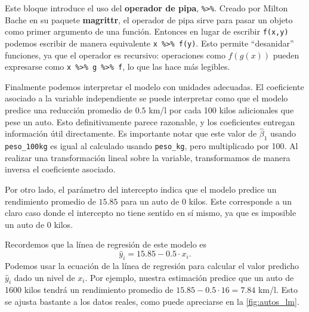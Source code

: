 \documentclass[12pt]{report}\usepackage[]{graphicx}\usepackage[]{color}
\makeatletter
\newcommand*{\paq}[1]{\textbf{#1}\index{#1@\textbf{#1}}}
\newcommand*{\kw}[1]{\textbf{#1}\index{#1}}
\makeatother
\begin{document}
\begin{Rbox}
Este bloque introduce el uso del \kw{operador de pipa}, \verb|%>%|.
Creado por Milton Bache en su paquete \paq{magrittr}, el operador de pipa sirve para pasar un objeto como primer argumento de una función.
Entonces en lugar de escribir \verb|f(x,y)| podemos escribir de manera equivalente \verb|x %>% f(y)|.
Esto permite ``desanidar'' funciones, ya que el operador es recursivo: operaciones como $f(g(x))$ pueden expresarse como \verb|x %>% g %>% f|, lo que las hace más legibles.
\end{Rbox}

Finalmente podemos interpretar el modelo con unidades adecuadas.
El coeficiente asociado a la variable independiente se puede interpretar como que el modelo predice una reducción promedio de $0.5$ km/l por cada 100 kilos adicionales que pese un auto.
Esto definitivamente parece razonable, y los coeficientes entregan información útil directamente.
Es importante notar que este valor de $\hat\beta_1$ usando \verb|peso_100kg| es igual al calculado usando \verb|peso_kg|, pero multiplicado por 100. Al realizar una transformación lineal sobre la variable, transformamos de manera inversa el coeficiente asociado.

Por otro lado, el parámetro del intercepto indica que el modelo predice un rendimiento promedio de $15.85$ para un auto de 0 kilos.
Este corresponde a un claro caso donde el intercepto no tiene sentido en sí mismo, ya que es imposible un auto de 0 kilos.

Recordemos que la línea de regresión de este modelo es
\begin{equation*}
\hat y_i = 15.85 -0.5 \cdot x_i.
\end{equation*}
Podemos usar la ecuación de la línea de regresión para calcular el valor predicho $\hat y_i$ dado un nivel de $x_i$. Por ejemplo, nuestra estimación predice que un auto de 1600 kilos tendrá un rendimiento promedio de $15.85 -0.5 \cdot 16 = 7.84$ km/l.
Esto se ajusta bastante a los datos reales, como puede apreciarse en la \autoref{fig:autos_lm}.
\end{document}

